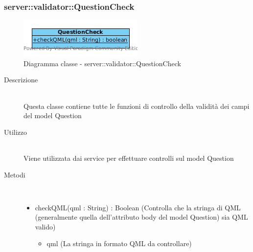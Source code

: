 \subsubsection[QuestionCheck]{server::validator::QuestionCheck}
\begin{center}
			\begin{figure}[H]
				\centering \includegraphics[scale=4, max width=\textwidth, max height=\myheight]{../img/diagrammiClassi/server/validator/QuestionCheck.png}
				\caption{Diagramma classe - server::validator::QuestionCheck}
			\end{figure}
		\end{center}\begin{description}
\item[Descrizione] \hfill \\
 Questa classe contiene tutte le funzioni di controllo della validità dei campi del model Question
\item[Utilizzo] \hfill \\
 Viene utilizzata dai service per effettuare controlli sul model Question
\item[Metodi] \hfill \\
 \vspace{-7mm}
\begin{itemize}
\item checkQML(qml : String) : Boolean (Controlla che la stringa di QML (generalmente quella dell'attributo body del model Question) sia QML valido)\begin{itemize}
\item qml (La stringa in formato QML da controllare)
\end{itemize}

\end{itemize}

\end{description}

\vspace{0.5cm}
